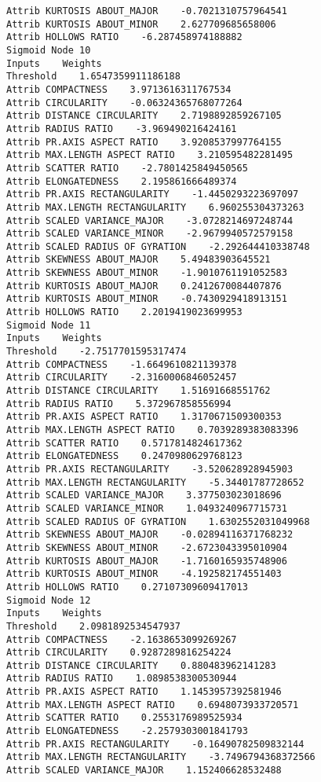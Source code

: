 \documentclass[
	article,			%
	11pt,				%
	oneside,			%
	a4paper,			%
	english,			%
	brazil,				%
	sumario=tradicional
	]{abntex2}
\begin{document}
\begin{lstlisting}
Attrib KURTOSIS ABOUT_MAJOR    -0.7021310757964541
Attrib KURTOSIS ABOUT_MINOR    2.627709685658006
Attrib HOLLOWS RATIO    -6.287458974188882
Sigmoid Node 10
Inputs    Weights
Threshold    1.6547359911186188
Attrib COMPACTNESS    3.9713616311767534
Attrib CIRCULARITY    -0.06324365768077264
Attrib DISTANCE CIRCULARITY    2.7198892859267105
Attrib RADIUS RATIO    -3.969490216424161
Attrib PR.AXIS ASPECT RATIO    3.9208537997764155
Attrib MAX.LENGTH ASPECT RATIO    3.210595482281495
Attrib SCATTER RATIO    -2.7801425849450565
Attrib ELONGATEDNESS    2.195861666489374
Attrib PR.AXIS RECTANGULARITY    -1.4450293223697097
Attrib MAX.LENGTH RECTANGULARITY    6.960255304373263
Attrib SCALED VARIANCE_MAJOR    -3.0728214697248744
Attrib SCALED VARIANCE_MINOR    -2.9679940572579158
Attrib SCALED RADIUS OF GYRATION    -2.292644410338748
Attrib SKEWNESS ABOUT_MAJOR    5.49483903645521
Attrib SKEWNESS ABOUT_MINOR    -1.9010761191052583
Attrib KURTOSIS ABOUT_MAJOR    0.2412670084407876
Attrib KURTOSIS ABOUT_MINOR    -0.7430929418913151
Attrib HOLLOWS RATIO    2.2019419023699953
Sigmoid Node 11
Inputs    Weights
Threshold    -2.7517701595317474
Attrib COMPACTNESS    -1.6649610821139378
Attrib CIRCULARITY    -2.3160006846052457
Attrib DISTANCE CIRCULARITY    1.51691668551762
Attrib RADIUS RATIO    5.372967858556994
Attrib PR.AXIS ASPECT RATIO    1.3170671509300353
Attrib MAX.LENGTH ASPECT RATIO    0.7039289383083396
Attrib SCATTER RATIO    0.5717814824617362
Attrib ELONGATEDNESS    0.2470980629768123
Attrib PR.AXIS RECTANGULARITY    -3.520628928945903
Attrib MAX.LENGTH RECTANGULARITY    -5.34401787728652
Attrib SCALED VARIANCE_MAJOR    3.377503023018696
Attrib SCALED VARIANCE_MINOR    1.0493240967715731
Attrib SCALED RADIUS OF GYRATION    1.6302552031049968
Attrib SKEWNESS ABOUT_MAJOR    -0.02894116371768232
Attrib SKEWNESS ABOUT_MINOR    -2.6723043395010904
Attrib KURTOSIS ABOUT_MAJOR    -1.7160165935748906
Attrib KURTOSIS ABOUT_MINOR    -4.192582174551403
Attrib HOLLOWS RATIO    0.27107309609417013
Sigmoid Node 12
Inputs    Weights
Threshold    2.0981892534547937
Attrib COMPACTNESS    -2.1638653099269267
Attrib CIRCULARITY    0.9287289816254224
Attrib DISTANCE CIRCULARITY    0.880483962141283
Attrib RADIUS RATIO    1.0898538300530944
Attrib PR.AXIS ASPECT RATIO    1.1453957392581946
Attrib MAX.LENGTH ASPECT RATIO    0.6948073933720571
Attrib SCATTER RATIO    0.2553176989525934
Attrib ELONGATEDNESS    -2.2579303001841793
Attrib PR.AXIS RECTANGULARITY    -0.16490782509832144
Attrib MAX.LENGTH RECTANGULARITY    -3.7496794368372566
Attrib SCALED VARIANCE_MAJOR    1.152406628532488

\end{lstlisting}
\end{document}

